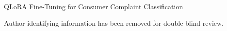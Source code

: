 \documentclass{article}
\begin{document}
\begin{center}
{\Large QLoRA Fine-Tuning for Consumer Complaint Classification}
\end{center}

\noindent Author-identifying information has been removed for double-blind review.
\end{document}
